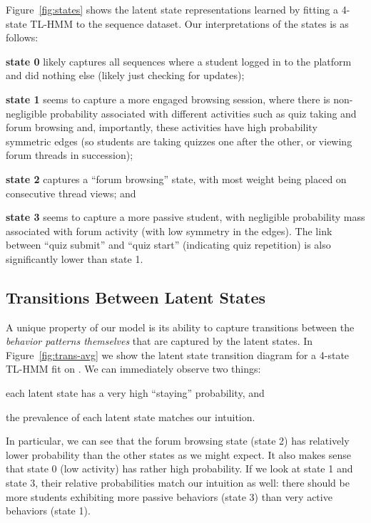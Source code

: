 Figure~\ref{fig:states} shows the latent state representations learned by
fitting a 4-state TL-HMM to the \textretrieval{} sequence dataset. Our
interpretations of the states is as follows:
\begin{enumerate*}[label=(\alph*)]
  \item \textbf{state 0} likely captures all sequences where a student
    logged in to the platform and did nothing else (likely just checking
    for updates);
  \item \textbf{state 1} seems to capture a more engaged browsing session,
    where there is non-negligible probability associated with different
    activities such as quiz taking and forum browsing and, importantly,
    these activities have high probability symmetric edges (so students are
    taking quizzes one after the other, or viewing forum threads in
    succession);
  \item \textbf{state 2} captures a ``forum browsing'' state, with most
    weight being placed on consecutive thread views; and
  \item \textbf{state 3} seems to capture a more passive student, with
    negligible probability mass associated with forum activity (with low
    symmetry in the edges). The link between ``quiz submit'' and ``quiz
    start'' (indicating quiz repetition) is also significantly lower than
    state 1.
\end{enumerate*}

\subsection{Transitions Between Latent States}
A unique property of our model is its ability to capture transitions
between the \emph{behavior patterns themselves} that are captured by the
latent states. In Figure~\ref{fig:trans-avg} we show the latent state
transition diagram for a 4-state TL-HMM fit on \textretrieval{}. We can
immediately observe two things: \begin{enumerate*}[label=(\arabic*)]
  \item each latent state has a very high ``staying'' probability, and
  \item the prevalence of each latent state matches our intuition.
\end{enumerate*}
In particular, we can see that the forum browsing state (state 2) has
relatively lower probability than the other states as we might expect. It
also makes sense that state 0 (low activity) has rather high probability.
If we look at state 1 and state 3, their relative probabilities match our
intuition as well: there should be more students exhibiting more passive
behaviors (state 3) than very active behaviors (state 1).

